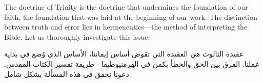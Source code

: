 The doctrine of Trinity is the doctrine that undermines the foundation of our faith, the foundation that was laid at the beginning of our work. The distinction between truth and error lies in hermeneutics—the method of interpreting the Bible. Let us thoroughly investigate this issue.


عقيدة الثالوث هي العقيدة التي تقوض أساس إيماننا، الأساس الذي وُضع في بداية عملنا. الفرق بين الحق والخطأ يكمن في الهرمنيوطيقا - طريقة تفسير الكتاب المقدس. دعونا نحقق في هذه المسألة بشكل شامل.


